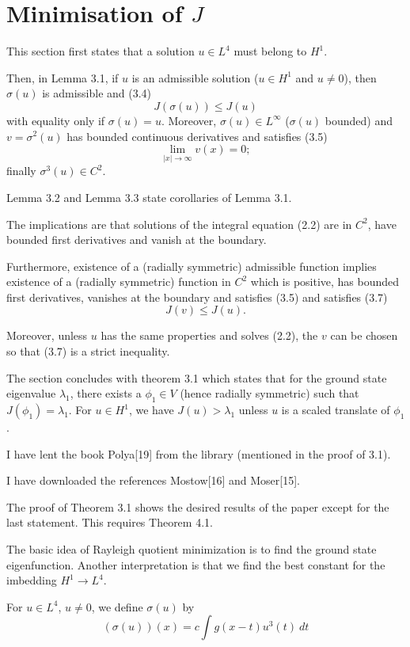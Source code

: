 \documentclass{article}
\newcommand{\be}{\begin{equation}}
\newcommand{\ee}{\end{equation}}
\newcommand{\revise}{\color{RedOrange}}
\newcommand{\rewrite}{\color{Goldenrod}}
\newcommand{\new}{\color{NavyBlue}}
\numberwithin{equation}{section}
\begin{document}
\section{Minimisation of $J$}
{\new This section first states that a solution $u\in L^4$ must belong to $H^1$.

Then, in Lemma 3.1, if $u$ is an admissible solution ($u\in H^1$ and $u\neq 0$), then $\sigma(u)$ is admissible and
(3.4) $$J(\sigma(u))\leq J(u)$$
with equality only if $\sigma(u) = u$. Moreover, $\sigma(u)\in L^\infty$ ($\sigma(u)$ bounded) and $v=\sigma^2(u)$ has bounded continuous derivatives and satisfies
(3.5) $$\underset{|x|\to\infty}{\lim} v(x)=0;$$
finally $\sigma^3(u)\in C^2$.

Lemma 3.2 and Lemma 3.3 state corollaries of Lemma 3.1.

The implications are that solutions of the integral equation (2.2) are in $C^2$, have bounded first derivatives and vanish at the boundary.

Furthermore, existence of a (radially symmetric) admissible function implies existence of a (radially symmetric) function in $C^2$ which is positive, has bounded first derivatives, vanishes at the boundary and satisfies (3.5) and satisfies
(3.7) $$J(v)\leq J(u).$$

Moreover, unless $u$ has the same properties and solves (2.2), the $v$ can be chosen so that (3.7) is a strict inequality.

The section concludes with theorem 3.1 which states that for the ground state eigenvalue $\lambda_1$, there exists a $\phi_1\in V$ (hence radially symmetric) such that $J(\phi_1)=\lambda_1$. For $u\in H^1$, we have $J(u)>\lambda_1$ unless $u$ is a scaled translate of $\phi_1$.

I have lent the book Polya[19] from the library (mentioned in the proof of 3.1).

I have downloaded the references Mostow[16] and Moser[15].

The proof of Theorem 3.1 shows the desired results of the paper except for the last statement. This requires Theorem 4.1.}

{\revise The basic idea of Rayleigh quotient minimization is to find the ground state eigenfunction. Another interpretation is that we find the best constant for the imbedding $H^1 \to L^4$.}

{\rewrite For $u\in L^4$, $u\neq 0$, we define $\sigma(u)$ by 
\be \label{sigmadef} \left(\sigma(u)\right)(x) = c \int g(x-t)u^3(t)~dt \ee}
\end{document}
